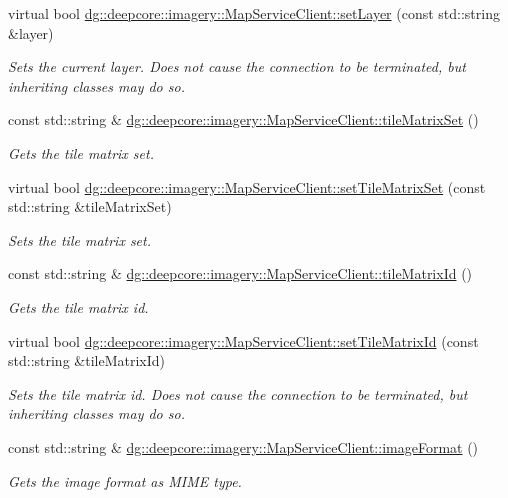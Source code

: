 \begin{DoxyCompactItemize}
virtual bool \hyperlink{group___imagery_module_ga509f0f787565fafc1618cc0e5fb2399a}{dg\+::deepcore\+::imagery\+::\+Map\+Service\+Client\+::set\+Layer} (const std\+::string \&layer)
\begin{DoxyCompactList}\small\item\em Sets the current layer. Does not cause the connection to be terminated, but inheriting classes may do so. \end{DoxyCompactList}\item 
const std\+::string \& \hyperlink{group___imagery_module_gae380a970bc0aa63d34e6f2295ea9c8f4}{dg\+::deepcore\+::imagery\+::\+Map\+Service\+Client\+::tile\+Matrix\+Set} ()
\begin{DoxyCompactList}\small\item\em Gets the tile matrix set. \end{DoxyCompactList}\item 
virtual bool \hyperlink{group___imagery_module_ga56c3ba986ce399f2fc6a1d9dcf886b49}{dg\+::deepcore\+::imagery\+::\+Map\+Service\+Client\+::set\+Tile\+Matrix\+Set} (const std\+::string \&tile\+Matrix\+Set)
\begin{DoxyCompactList}\small\item\em Sets the tile matrix set. \end{DoxyCompactList}\item 
const std\+::string \& \hyperlink{group___imagery_module_gae6a1721e1da9ab60ab4e62240baf304b}{dg\+::deepcore\+::imagery\+::\+Map\+Service\+Client\+::tile\+Matrix\+Id} ()
\begin{DoxyCompactList}\small\item\em Gets the tile matrix id. \end{DoxyCompactList}\item 
virtual bool \hyperlink{group___imagery_module_ga5f85c6b91d45f419905321b3752aa70c}{dg\+::deepcore\+::imagery\+::\+Map\+Service\+Client\+::set\+Tile\+Matrix\+Id} (const std\+::string \&tile\+Matrix\+Id)
\begin{DoxyCompactList}\small\item\em Sets the tile matrix id. Does not cause the connection to be terminated, but inheriting classes may do so. \end{DoxyCompactList}\item 
const std\+::string \& \hyperlink{group___imagery_module_ga847bc79084bf9856525ce04240a24428}{dg\+::deepcore\+::imagery\+::\+Map\+Service\+Client\+::image\+Format} ()
\begin{DoxyCompactList}\small\item\em Gets the image format as M\+I\+ME type. \end{DoxyCompactList}\item 

\end{DoxyCompactItemize}
